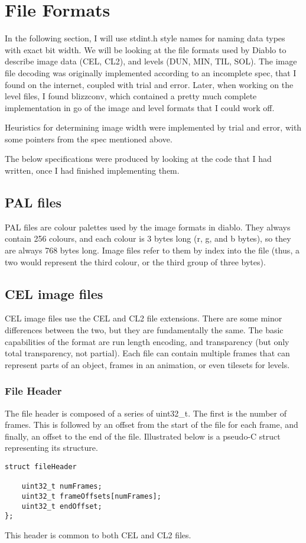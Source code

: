 \chapter{File Formats}
In the following section, I will use stdint.h style names for naming data types with exact bit width.
We will be looking at the file formats used by Diablo to describe image data (CEL, CL2), and levels (DUN, MIN, TIL, SOL).
The image file decoding was originally implemented according to an incomplete spec\cite{celspec}, that I found on the internet, coupled with trial and error. Later, when working on the level files, I found blizzconv\cite{blizzconv}, which contained a pretty much complete implementation in go of the image and level formats that I could work off.

Heuristics for determining image width were implemented by trial and error, with some pointers from the spec mentioned above.

The below specifications were produced by looking at the code that I had written, once I had finished implementing them.

\section{PAL files}
    PAL files are colour palettes used by the image formats in diablo. They always contain 256 colours, and each colour is 3 bytes long (r, g, and b bytes), so they are always 768 bytes long. Image files refer to them by index into the file (thus, a two would represent the third colour, or the third group of three bytes).

\section{CEL image files}
	CEL image files use the CEL and CL2 file extensions. There are some minor differences between the two, but they are fundamentally the same. The basic capabilities of the format are run length encoding, and transparency (but only total transparency, not partial). Each file can contain multiple frames that can represent parts of an object, frames in an animation, or even tilesets for levels.

	\subsection{File Header}
	\label{sec:fileheaders}
	The file header is composed of a series of uint32\_t. The first is the number of frames. This is followed by an offset from the start of the file for each frame, and finally, an offset to the end of the file. Illustrated below is a pseudo-C struct representing its structure.
	\begin{lstlisting}
struct fileHeader

	uint32_t numFrames;
	uint32_t frameOffsets[numFrames];
	uint32_t endOffset;
};
	\end{lstlisting}
	 This header is common to both CEL and CL2 files.
	 
